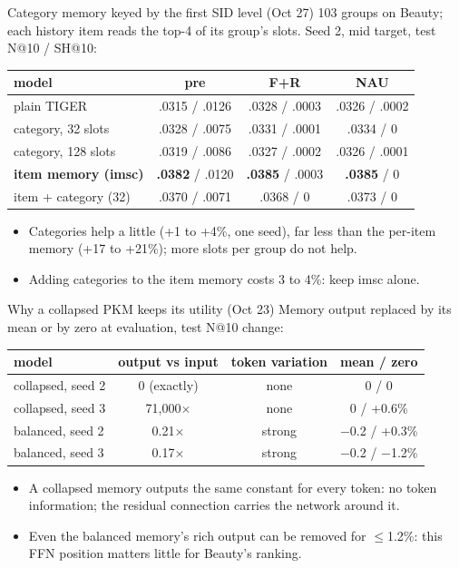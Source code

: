 \documentclass{beamer}
\begin{document}
\begin{frame}{Category memory keyed by the first SID level (Oct 27)}
103 groups on Beauty; each history item reads the top-4 of its group's slots.
Seed 2, mid target, test N@10 / SH@10:
\begin{center}
\footnotesize\setlength{\tabcolsep}{3pt}
\begin{tabular}{|l|c|c|c|}
\hline
model & pre & F+R & NAU \\
\hline
plain TIGER & .0315 / .0126 & .0328 / .0003 & .0326 / .0002 \\
category, 32 slots & .0328 / .0075 & .0331 / .0001 & .0334 / 0 \\
category, 128 slots & .0319 / .0086 & .0327 / .0002 & .0326 / .0001 \\
\textbf{item memory (imsc)} & \textbf{.0382} / .0120 & \textbf{.0385} / .0003 & \textbf{.0385} / 0 \\
item + category (32) & .0370 / .0071 & .0368 / 0 & .0373 / 0 \\
\hline
\end{tabular}
\end{center}
\begin{itemize}
  \item Categories help a little (+1 to +4\%, one seed), far less than the
        per-item memory (+17 to +21\%); more slots per group do not help.
  \item Adding categories to the item memory costs 3 to 4\%: keep imsc alone.
\end{itemize}
\end{frame}

\begin{frame}{Why a collapsed PKM keeps its utility (Oct 23)}
Memory output replaced by its mean or by zero at evaluation, test N@10 change:
\begin{center}
\footnotesize\setlength{\tabcolsep}{4pt}
\begin{tabular}{|l|c|c|c|}
\hline
model & output vs input & token variation & mean / zero \\
\hline
collapsed, seed 2 & 0 (exactly) & none & 0 / 0 \\
collapsed, seed 3 & 71{,}000$\times$ & none & 0 / +0.6\% \\
balanced, seed 2  & 0.21$\times$ & strong & $-$0.2 / +0.3\% \\
balanced, seed 3  & 0.17$\times$ & strong & $-$0.2 / $-$1.2\% \\
\hline
\end{tabular}
\end{center}
\begin{itemize}
  \item A collapsed memory outputs the same constant for every token: no token
        information; the residual connection carries the network around it.
  \item Even the balanced memory's rich output can be removed for $\leq$1.2\%:
        this FFN position matters little for Beauty's ranking.
\end{itemize}
\end{frame}
\end{document}
